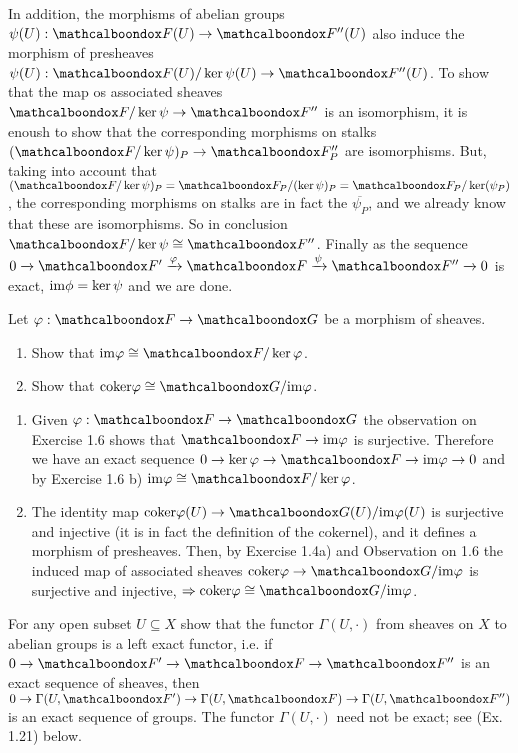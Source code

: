 \begin{sol}
\begin{enumerate}[label=\alph*)]
		In addition, the morphisms of abelian groups $\psi(U): \sF(U) \to \sF''(U)$ also induce the morphism of presheaves $\psi(U): \sF(U)/\ker \psi(U) \to \sF''(U)$. To show that the map os associated sheaves $\sF/\ker \psi \to \sF''$ is an isomorphism, it is enoush to show that the corresponding morphisms on stalks $(\sF/\ker \psi)_P \to \sF''_P$ are isomorphisms. But, taking into account that $(\sF/\ker \psi)_P = \sF_P / (\ker \psi)_P = \sF_P / \ker(\psi_P)$, the corresponding morphisms on stalks are in fact the $\overline{\psi_P}$, and we already know that these are isomorphisms. So in conclusion $\sF/\ker \psi \cong \sF''$. Finally as the sequence $0 \xrightarrow[]{} \sF' \xrightarrow[]{\varphi} \sF \xrightarrow[]{\psi} \sF'' \xrightarrow[]{} 0$ is exact, $\mathrm{im} \phi = \ker \psi$ and we are done.
	\end{enumerate}
\end{sol}

\begin{ex}
	Let $\varphi: \sF \to \sG$ be a morphism of sheaves.
	\begin{enumerate}[label=\alph*)]
		\item Show that $\ima \varphi \cong \sF/\ker \varphi$.
		\item Show that $\mathrm{coker} \varphi \cong \sG /\ima \varphi$.
	\end{enumerate}
\end{ex}

\begin{sol}
	\begin{enumerate}[label=\alph*)]
		\item Given $\varphi: \sF \to \sG$ the observation on Exercise 1.6 shows that $\sF \to \ima \varphi$ is surjective. Therefore we have an exact sequence $0 \to \ker \varphi \to \sF \to \ima \varphi \to 0$ and by Exercise 1.6 b) $\ima \varphi \cong \sF / \ker \varphi$.

		\item The identity map $\mathrm{coker} \varphi (U) \to \sG(U)/ \ima \varphi(U)$ is surjective and injective (it is in fact the definition of the cokernel), and it defines a morphism of presheaves. Then, by Exercise 1.4a) and Observation on 1.6 the induced map of associated sheaves $\text{coker} \varphi \to \sG/ \ima \varphi$ is surjective and injective, $\imp \text{coker} \varphi \cong \sG/ \ima \varphi$.
	\end{enumerate}
\end{sol}

\begin{ex}
	For any open subset $U \subseteq X$ show that the functor $\Gamma(U,·)$ from sheaves on $X$ to abelian groups is a left exact functor, i.e. if $0 \to \sF' \to \sF \to \sF''$ is an exact sequence of sheaves, then $0 \to \Gamma(U,\sF') \to \Gamma(U, \sF) \to \Gamma(U, \sF'')$ is an exact sequence of groups. The functor $\Gamma(U,\cdot)$ need not be exact; see (Ex. 1.21) below.
\end{ex}

